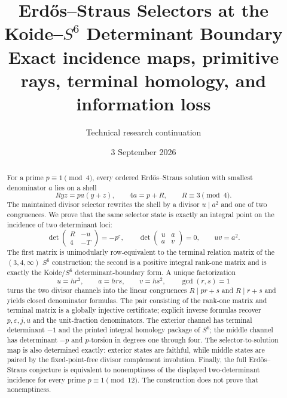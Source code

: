 \documentclass[11pt]{article}
\title{Erd\H{o}s--Straus Selectors at the Koide--$S^6$ Determinant Boundary\\
\large Exact incidence maps, primitive rays, terminal homology, and information loss}
\author{Technical research continuation}
\date{3 September 2026}
\theoremstyle{definition}
\theoremstyle{remark}
\begin{document}
\maketitle

\begin{center}
\end{center}

\begin{abstract}
For a prime $p\equiv1\pmod4$, every ordered Erd\H{o}s--Straus solution with
smallest denominator $a$ lies on a shell
\[
 Ryz=pa(y+z),\qquad 4a=p+R,\qquad R\equiv3\pmod4.
\]
The maintained divisor selector rewrites the shell by a divisor $u\mid a^2$
and one of two congruences.  We prove that the same selector state is exactly
an integral point on the incidence of two determinant loci:
\[
 \det\begin{pmatrix}R&-u\\4&-T\end{pmatrix}=-p^\varepsilon,
 \qquad
 \det\begin{pmatrix}u&a\\a&v\end{pmatrix}=0,
 \qquad uv=a^2.
\]
The first matrix is unimodularly row-equivalent to the terminal relation matrix
of the $(3,4,\infty)$ $S^6$ construction; the second is a positive integral
rank-one matrix and is exactly the Koide/$S^6$ determinant-boundary form.  A
unique factorization
\[
 u=hr^2,\qquad a=hrs,\qquad v=hs^2,\qquad \gcd(r,s)=1
\]
turns the two divisor channels into the linear congruences
$R\mid pr+s$ and $R\mid r+s$ and yields closed denominator formulas.  The pair
consisting of the rank-one matrix and terminal matrix is a globally injective
certificate; explicit inverse formulas recover $p,\varepsilon,j,u$ and the
unit-fraction denominators.  The exterior channel has terminal determinant
$-1$ and the printed integral homology package of $S^6$; the middle channel has
determinant $-p$ and $p$-torsion in degrees one through four.  The selector-to-solution map is also determined exactly: exterior states
are faithful, while middle states are paired by the fixed-point-free divisor
complement involution.  Finally, the full Erd\H{o}s--Straus conjecture is
equivalent to nonemptiness of the displayed two-determinant incidence for
every prime \(p\equiv1\pmod{12}\).  The construction does not prove that
nonemptiness.
\end{abstract}
\end{document}
